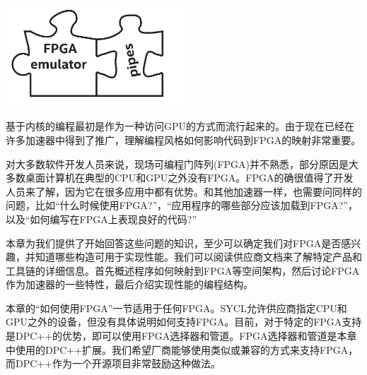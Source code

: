 \begin{center}
	\includegraphics[width=0.5\textwidth]{content/chapter-17/images/1}
\end{center}

基于内核的编程最初是作为一种访问GPU的方式而流行起来的。由于现在已经在许多加速器中得到了推广，理解编程风格如何影响代码到FPGA的映射非常重要。\par

对大多数软件开发人员来说，现场可编程门阵列(FPGA)并不熟悉，部分原因是大多数桌面计算机在典型的CPU和GPU之外没有FPGA。FPGA的确很值得了开发人员来了解，因为它在很多应用中都有优势。和其他加速器一样，也需要问同样的问题，比如“什么时候使用FPGA?”，“应用程序的哪些部分应该加载到FPGA?”，以及“如何编写在FPGA上表现良好的代码?”\par

本章为我们提供了开始回答这些问题的知识，至少可以确定我们对FPGA是否感兴趣，并知道哪些构造可用于实现性能。我们可以阅读供应商文档来了解特定产品和工具链的详细信息。首先概述程序如何映射到FPGA等空间架构，然后讨论FPGA作为加速器的一些特性，最后介绍实现性能的编程结构。\par

本章的“如何使用FPGA”一节适用于任何FPGA。SYCL允许供应商指定CPU和GPU之外的设备，但没有具体说明如何支持FPGA。目前，对于特定的FPGA支持是DPC++的优势，即可以使用FPGA选择器和管道。FPGA选择器和管道是本章中使用的DPC++扩展。我们希望厂商能够使用类似或兼容的方式来支持FPGA，而DPC++作为一个开源项目非常鼓励这种做法。\par






















































